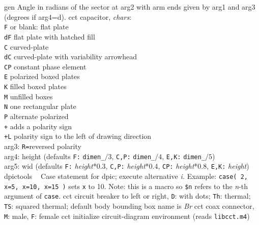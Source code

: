%
%
  {gen}%
  {Angle in radians of the sector at arg2 with arm ends given
   by arg1 and arg3 (degrees if arg4=d).}%
%
  {cct}%
  {capacitor, {\sl chars}:\\
    {\tt F} or blank: flat plate\\
    {\tt dF} flat plate with hatched fill\\
    {\tt C} curved-plate\\
    {\tt dC} curved-plate with variability arrowhead\\
    {\tt CP} constant phase element\\
    {\tt E} polarized boxed plates\\
    {\tt K} filled boxed plates\\
    {\tt M} unfilled boxes\\
    {\tt N} one rectangular plate\\
    {\tt P} alternate polarized\\
    {\tt +} adds a polarity sign\\
    {\tt +L} polarity sign to the left of drawing direction\\
    arg3:  {\tt R=}reversed polarity\\
    arg4: height (defaults {\tt F:} {\tt dimen\_}$/3$,
      {\tt C,P:} {\tt dimen\_}$/4$,
      {\tt E,K:} {\tt dimen\_}$/5$)\\
    arg5: wid (defaults {\tt F:} {\sl height}*0.3,
      {\tt C,P:} {\sl height}*0.4,
      {\tt CP:} {\sl height}*0.8,
      {\tt E,K:} {\sl height})
    }%
%
  {dpictools}%
  {$\;\;$ Case statement for dpic; execute alternative {\sl i.}
   Example: {\tt case( 2, x=5, x=10, x=15 )} sets {\tt x} to 10.
   Note: this is a macro so {\tt \${}n} refers to the {\sl n}-th
	 argument of {\tt case}.}%
%
  {cct}%
  {circuit breaker to left or right, {\tt D}: with dots; {\tt Th}: thermal;
   {\tt TS}: squared thermal; default body bounding box name is
     {\sl Br}}%
%
  {cct}%
  {coax connector, {\tt M}: male, {\tt F}: female
    }%
%
  {cct}%
  {initialize circuit-diagram environment (reads {\tt libcct.m4})}%
%
